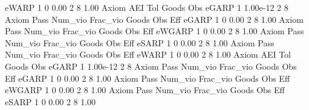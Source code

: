        eWARP {\VBAR}    1           0        0.00           2           8        1.00  
{\smallskip}
       Axiom {\VBAR}       AEI        Tol      Goods        Obs 
       eGARP {\VBAR}         1   1.00e-12          2          8 
{\smallskip}
{\smallskip}
{\smallskip}
       Axiom {\VBAR} Pass     Num_vio    Frac_vio       Goods         Obs         Eff  
       eGARP {\VBAR}    1           0        0.00           2           8        1.00  
{\smallskip}
{\smallskip}
{\smallskip}
       Axiom {\VBAR} Pass     Num_vio    Frac_vio       Goods         Obs         Eff  
      eWGARP {\VBAR}    1           0        0.00           2           8        1.00  
{\smallskip}
{\smallskip}
{\smallskip}
       Axiom {\VBAR} Pass     Num_vio    Frac_vio       Goods         Obs         Eff  
       eSARP {\VBAR}    1           0        0.00           2           8        1.00  
{\smallskip}
{\smallskip}
{\smallskip}
       Axiom {\VBAR} Pass     Num_vio    Frac_vio       Goods         Obs         Eff  
       eWARP {\VBAR}    1           0        0.00           2           8        1.00  
{\smallskip}
       Axiom {\VBAR}       AEI        Tol      Goods        Obs 
       eGARP {\VBAR}         1   1.00e-12          2          8 
{\smallskip}
{\smallskip}
{\smallskip}
       Axiom {\VBAR} Pass     Num_vio    Frac_vio       Goods         Obs         Eff  
       eGARP {\VBAR}    1           0        0.00           2           8        1.00  
{\smallskip}
{\smallskip}
{\smallskip}
       Axiom {\VBAR} Pass     Num_vio    Frac_vio       Goods         Obs         Eff  
      eWGARP {\VBAR}    1           0        0.00           2           8        1.00  
{\smallskip}
{\smallskip}
{\smallskip}
       Axiom {\VBAR} Pass     Num_vio    Frac_vio       Goods         Obs         Eff  
       eSARP {\VBAR}    1           0        0.00           2           8        1.00  
{\smallskip}
{\smallskip}
{\smallskip}
